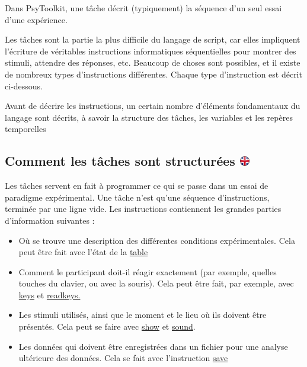 \documentclass[
]{book}
\providecommand{\tightlist}{%
  \setlength{\itemsep}{0pt}\setlength{\parskip}{0pt}}
\begin{document}
Dans PsyToolkit, une tâche décrit (typiquement) la séquence d'un seul
essai d'une expérience.

Les tâches sont la partie la plus difficile du langage de script, car
elles impliquent l'écriture de véritables instructions informatiques
séquentielles pour montrer des stimuli, attendre des réponses, etc.
Beaucoup de choses sont possibles, et il existe de nombreux types
d'instructions différentes. Chaque type d'instruction est décrit
ci-dessous.

Avant de décrire les instructions, un certain nombre d'éléments
fondamentaux du langage sont décrits, à savoir la structure des tâches,
les variables et les repères temporelles

\hypertarget{comment-les-tuxe2ches-sont-structuruxe9es}{%
\subsection[Comment les tâches sont structurées
]{\texorpdfstring{Comment les tâches sont structurées
\href{https://www.psytoolkit.org/doc3.2.0/syntax.html\#_how_tasks_are_structured}{\protect\includegraphics{img/ukflag.png}}}{Comment les tâches sont structurées }}\label{comment-les-tuxe2ches-sont-structuruxe9es}}

Les tâches servent en fait à programmer ce qui se passe dans un essai de
paradigme expérimental. Une tâche n'est qu'une séquence d'instructions,
terminée par une ligne vide. Les instructions contiennent les grandes
parties d'information suivantes :

\begin{itemize}
\tightlist
\item
  Où se trouve une description des différentes conditions
  expérimentales. Cela peut être fait avec l'état de la
  \protect\hyperlink{task-table}{table}
\item
  Comment le participant doit-il réagir exactement (par exemple, quelles
  touches du clavier, ou avec la souris). Cela peut être fait, par
  exemple, avec \protect\hyperlink{task-keys}{keys} et
  \protect\hyperlink{task-readkey}{readkeys.}
\item
  Les stimuli utilisés, ainsi que le moment et le lieu où ils doivent
  être présentés. Cela peut se faire avec
  \protect\hyperlink{task-show}{show} et
  \protect\hyperlink{task-sound}{sound}.
\item
  Les données qui doivent être enregistrées dans un fichier pour une
  analyse ultérieure des données. Cela se fait avec l'instruction
  \protect\hyperlink{task-save}{save}
\end{itemize}
\end{document}
